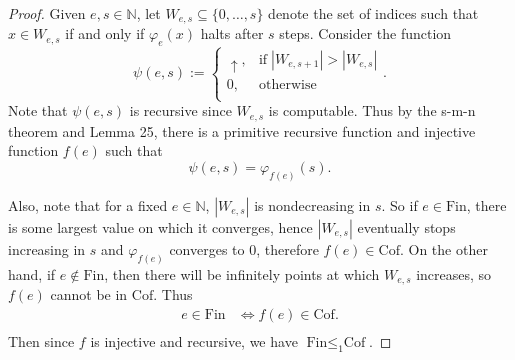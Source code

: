 \documentclass{article}
\begin{document}
\begin{enumerate}[label={\bf Q\arabic*:}]
    \begin{proof}
      Given $e,s\in\mathbb{N}$, let $W_{e,s}\subseteq\{0,\ldots,s\}$ denote
      the set of indices such that $x\in W_{e,s}$ if and only if
      $\varphi_e(x)$ halts after $s$ steps. Consider the function
      \begin{equation*}
        \psi(e,s) :=
        \begin{cases}
          \uparrow, &\text{if}\; |W_{e,s+1}|>|W_{e,s}|\\
          0, &\text{otherwise}\\
        \end{cases}.
      \end{equation*}
      Note that $\psi(e,s)$ is recursive since $W_{e,s}$ is computable.
      Thus by the s-m-n theorem and Lemma 25, there is a primitive
      recursive function and injective function $f(e)$ such that
      \[\psi(e,s)=\varphi_{f(e)}(s).\]

      Also, note that for a fixed $e\in\mathbb{N}$, $|W_{e,s}|$ is
      nondecreasing in $s$.  So if $e\in\text{Fin}$, there is some largest
      value on which it converges, hence $|W_{e,s}|$ eventually stops
      increasing in $s$ and $\varphi_{f(e)}$ converges to 0, therefore
      $f(e)\in\text{Cof}$. On the other hand, if $e\not\in\text{Fin}$,
      then there will be infinitely points at which $W_{e,s}$ increases, so
      $f(e)$ cannot be in $\text{Cof}$. Thus
      \begin{align*}
        e\in\text{Fin} &\Leftrightarrow f(e)\in\text{Cof}.\\
      \end{align*}
      Then since $f$ is injective and recursive, we have
      $\text{Fin}\leq_1\text{Cof}$.
    \end{proof}
\end{enumerate}
\end{document}
